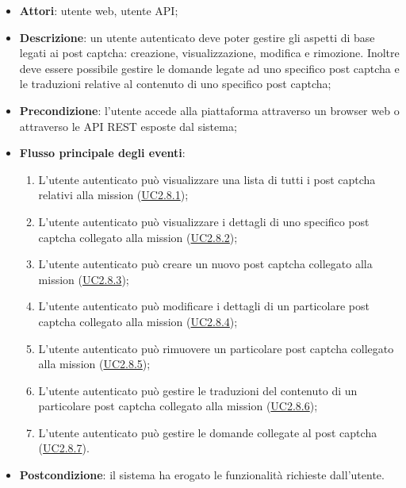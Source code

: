 \begin{itemize}
\item \textbf{Attori}: utente web, utente API;
\item \textbf{Descrizione}: un utente autenticato deve poter gestire gli aspetti di base legati ai post captcha: creazione, visualizzazione, modifica e rimozione. Inoltre deve essere possibile gestire le domande legate ad uno specifico post captcha e le traduzioni relative al contenuto di uno specifico post captcha; 
      \item \textbf{Precondizione}: l'utente accede alla piattaforma attraverso un browser web o attraverso le API REST esposte dal sistema;

        \item \textbf{Flusso principale degli eventi}:
          \begin{enumerate}
          \item L'utente autenticato può visualizzare una lista di tutti i post captcha relativi alla mission (\hyperlink{UC2.8.1}{UC2.8.1});
          \item L'utente autenticato può visualizzare i dettagli di uno specifico post captcha collegato alla mission (\hyperlink{UC2.8.2}{UC2.8.2});
          \item L'utente autenticato può creare un nuovo post captcha collegato alla mission (\hyperlink{UC2.8.3}{UC2.8.3});
          \item L'utente autenticato può modificare i dettagli di un particolare post captcha collegato alla mission (\hyperlink{UC2.8.4}{UC2.8.4});
          \item L'utente autenticato può rimuovere un particolare post captcha collegato alla mission (\hyperlink{UC2.8.5}{UC2.8.5});
          \item L'utente autenticato può gestire le traduzioni del contenuto di un particolare post captcha collegato alla mission (\hyperlink{UC2.8.6}{UC2.8.6});
          \item L'utente autenticato può gestire le domande collegate al post captcha (\hyperlink{UC2.8.7}{UC2.8.7}).

      \end{enumerate}
    \item \textbf{Postcondizione}: il sistema ha erogato le funzionalità richieste dall'utente.
  \end{itemize}
\hypertarget{UC2.8.1}{}
